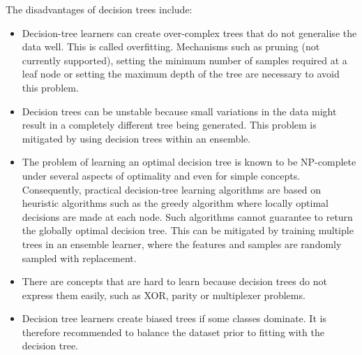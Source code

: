 \documentclass[12pt]{article}
\begin{document}
		The disadvantages of decision trees include:
		\begin{itemize}
			\item Decision-tree learners can create over-complex trees that do not generalise the data well. This is called overfitting. Mechanisms such as pruning (not currently supported), setting the minimum number of samples required at a leaf node or setting the maximum depth of the tree are necessary to avoid this problem.
			\item Decision trees can be unstable because small variations in the data might result in a completely different tree being generated. This problem is mitigated by using decision trees within an ensemble.
			\item The problem of learning an optimal decision tree is known to be NP-complete under several aspects of optimality and even for simple concepts. Consequently, practical decision-tree learning algorithms are based on heuristic algorithms such as the greedy algorithm where locally optimal decisions are made at each node. Such algorithms cannot guarantee to return the globally optimal decision tree. This can be mitigated by training multiple trees in an ensemble learner, where the features and samples are randomly sampled with replacement.
			\item There are concepts that are hard to learn because decision trees do not express them easily, such as XOR, parity or multiplexer problems.
			\item Decision tree learners create biased trees if some classes dominate. It is therefore recommended to balance the dataset prior to fitting with the decision tree.
		\end{itemize}
\end{document}
